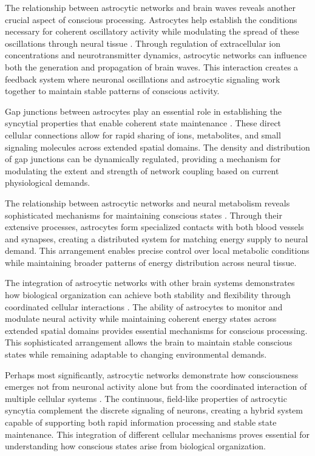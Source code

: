 The relationship between astrocytic networks and brain waves reveals another crucial aspect of conscious processing. Astrocytes help establish the conditions necessary for coherent oscillatory activity while modulating the spread of these oscillations through neural tissue \cite{Volterra2005}. Through regulation of extracellular ion concentrations and neurotransmitter dynamics, astrocytic networks can influence both the generation and propagation of brain waves. This interaction creates a feedback system where neuronal oscillations and astrocytic signaling work together to maintain stable patterns of conscious activity.

Gap junctions between astrocytes play an essential role in establishing the syncytial properties that enable coherent state maintenance \cite{Wallraff2006}. These direct cellular connections allow for rapid sharing of ions, metabolites, and small signaling molecules across extended spatial domains. The density and distribution of gap junctions can be dynamically regulated, providing a mechanism for modulating the extent and strength of network coupling based on current physiological demands.

The relationship between astrocytic networks and neural metabolism reveals sophisticated mechanisms for maintaining conscious states \cite{Parpura2012}. Through their extensive processes, astrocytes form specialized contacts with both blood vessels and synapses, creating a distributed system for matching energy supply to neural demand. This arrangement enables precise control over local metabolic conditions while maintaining broader patterns of energy distribution across neural tissue.

The integration of astrocytic networks with other brain systems demonstrates how biological organization can achieve both stability and flexibility through coordinated cellular interactions \cite{Khakh2015}. The ability of astrocytes to monitor and modulate neural activity while maintaining coherent energy states across extended spatial domains provides essential mechanisms for conscious processing. This sophisticated arrangement allows the brain to maintain stable conscious states while remaining adaptable to changing environmental demands.

Perhaps most significantly, astrocytic networks demonstrate how consciousness emerges not from neuronal activity alone but from the coordinated interaction of multiple cellular systems \cite{Nedergaard2003}. The continuous, field-like properties of astrocytic syncytia complement the discrete signaling of neurons, creating a hybrid system capable of supporting both rapid information processing and stable state maintenance. This integration of different cellular mechanisms proves essential for understanding how conscious states arise from biological organization.

